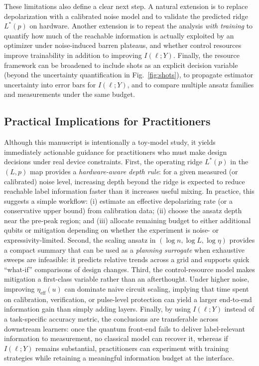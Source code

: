 \documentclass[]{ieeeaccess}
\newcommand{\MI}{I(\ell;Y)}
\begin{document}
These limitations also define a clear next step. A natural extension is to replace depolarization with a calibrated noise model and to validate the predicted ridge $L^{\ast}(p)$ on hardware. Another extension is to repeat the analysis \emph{with training} to quantify how much of the reachable information is actually exploited by an optimizer under noise-induced barren plateaus, and whether control resources improve trainability in addition to improving $\MI$. Finally, the resource framework can be broadened to include shots as an explicit decision variable (beyond the uncertainty quantification in Fig.~\ref{fig:shots}), to propagate estimator uncertainty into error bars for $\MI$, and to compare multiple ansatz families and measurements under the same budget.

\subsection{Practical Implications for Practitioners}
Although this manuscript is intentionally a toy-model study, it yields immediately actionable guidance for practitioners who must make design decisions under real device constraints. First, the operating ridge $L^{\ast}(p)$ in the $(L,p)$ map provides a \emph{hardware-aware depth rule}: for a given measured (or calibrated) noise level, increasing depth beyond the ridge is expected to reduce reachable label information faster than it increases useful mixing. In practice, this suggests a simple workflow: (i) estimate an effective depolarizing rate (or a conservative upper bound) from calibration data; (ii) choose the ansatz depth near the pre-peak region; and (iii) allocate remaining budget to either additional qubits or mitigation depending on whether the experiment is noise- or expressivity-limited. Second, the scaling ansatz in $(\log n,\log L,\log\eta)$ provides a compact summary that can be used as a \emph{planning surrogate} when exhaustive sweeps are infeasible: it predicts relative trends across a grid and supports quick ``what-if'' comparisons of design changes. Third, the control-resource model makes mitigation a first-class variable rather than an afterthought. Under higher noise, improving $\eta_{\mathrm{eff}}(u)$ can dominate naive circuit scaling, implying that time spent on calibration, verification, or pulse-level protection can yield a larger end-to-end information gain than simply adding layers. Finally, by using $\MI$ instead of a task-specific accuracy metric, the conclusions are transferable across downstream learners: once the quantum front-end fails to deliver label-relevant information to measurement, no classical model can recover it, whereas if $\MI$ remains substantial, practitioners can experiment with training strategies while retaining a meaningful information budget at the interface.
\end{document}
